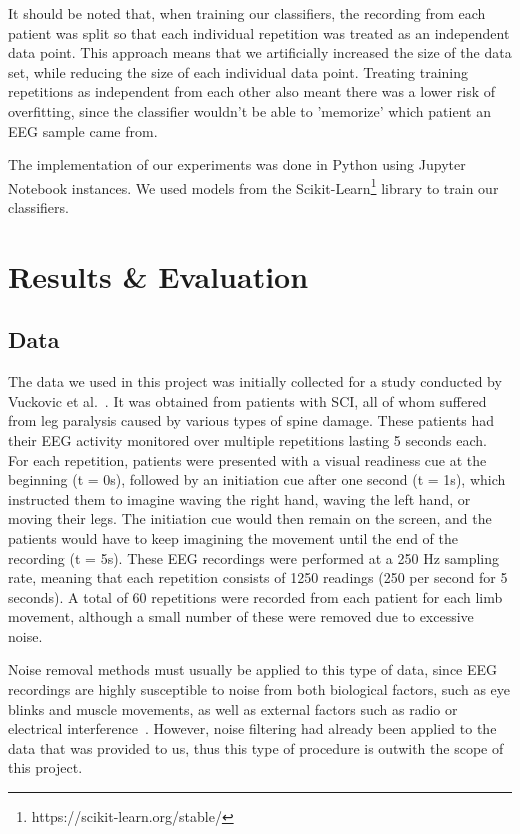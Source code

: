 \documentclass{mpaper}
\begin{document}
It should be noted that, when training our classifiers, the recording from each patient was split so that each individual repetition was treated as an independent data point. This approach means that we artificially increased the size of the data set, while reducing the size of each individual data point. Treating training repetitions as independent from each other also meant there was a lower risk of overfitting, since the classifier wouldn't be able to 'memorize' which patient an EEG sample came from.

The implementation of our experiments was done in Python using Jupyter Notebook instances. We used models from the Scikit-Learn\footnote{https://scikit-learn.org/stable/} library to train our classifiers.


\section{Results \& Evaluation}

\subsection{Data}
\label{data}

The data we used in this project was initially collected for a study conducted by Vuckovic et al.~\cite{vuckovic_dynamic_2014}. It was obtained from patients with SCI, all of whom suffered from leg paralysis caused by various types of spine damage. These patients had their EEG activity monitored over multiple repetitions lasting 5 seconds each. For each repetition, patients were presented with a visual readiness cue at the beginning (t = 0s), followed by an initiation cue after one second (t = 1s), which instructed them to imagine waving the right hand, waving the left hand, or moving their legs. The initiation cue would then remain on the screen, and the patients would have to keep imagining the movement until the end of the recording (t = 5s). These EEG recordings were performed at a 250 Hz sampling rate, meaning that each repetition consists of 1250 readings (250 per second for 5 seconds). A total of 60 repetitions were recorded from each patient for each limb movement, although a small number of these were removed due to excessive noise.

Noise removal methods must usually be applied to this type of data, since EEG recordings are highly susceptible to noise from both biological factors, such as eye blinks and muscle movements, as well as external factors such as radio or electrical interference~\cite{fitzgibbon_removal_2007}. However, noise filtering had already been applied to the data that was provided to us, thus this type of procedure is outwith the scope of this project.
\end{document}

